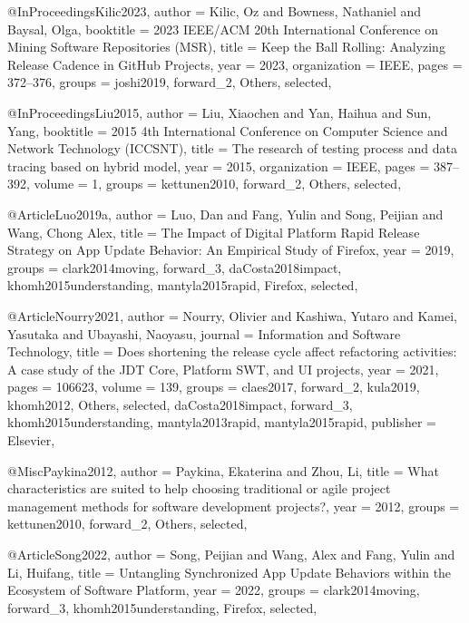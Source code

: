 @InProceedings{Kilic2023,
  author       = {Kilic, Oz and Bowness, Nathaniel and Baysal, Olga},
  booktitle    = {2023 IEEE/ACM 20th International Conference on Mining Software Repositories (MSR)},
  title        = {Keep the Ball Rolling: Analyzing Release Cadence in GitHub Projects},
  year         = {2023},
  organization = {IEEE},
  pages        = {372--376},
  groups       = {joshi2019, forward_2, Others, selected},
}

@InProceedings{Liu2015,
  author       = {Liu, Xiaochen and Yan, Haihua and Sun, Yang},
  booktitle    = {2015 4th International Conference on Computer Science and Network Technology (ICCSNT)},
  title        = {The research of testing process and data tracing based on hybrid model},
  year         = {2015},
  organization = {IEEE},
  pages        = {387--392},
  volume       = {1},
  groups       = {kettunen2010, forward_2, Others, selected},
}

@Article{Luo2019a,
  author = {Luo, Dan and Fang, Yulin and Song, Peijian and Wang, Chong Alex},
  title  = {The Impact of Digital Platform Rapid Release Strategy on App Update Behavior: An Empirical Study of Firefox},
  year   = {2019},
  groups = {clark2014moving, forward_3, daCosta2018impact, khomh2015understanding, mantyla2015rapid, Firefox, selected},
}

@Article{Nourry2021,
  author    = {Nourry, Olivier and Kashiwa, Yutaro and Kamei, Yasutaka and Ubayashi, Naoyasu},
  journal   = {Information and Software Technology},
  title     = {Does shortening the release cycle affect refactoring activities: A case study of the JDT Core, Platform SWT, and UI projects},
  year      = {2021},
  pages     = {106623},
  volume    = {139},
  groups    = {claes2017, forward_2, kula2019, khomh2012, Others, selected, daCosta2018impact, forward_3, khomh2015understanding, mantyla2013rapid, mantyla2015rapid},
  publisher = {Elsevier},
}

@Misc{Paykina2012,
  author = {Paykina, Ekaterina and Zhou, Li},
  title  = {What characteristics are suited to help choosing traditional or agile project management methods for software development projects?},
  year   = {2012},
  groups = {kettunen2010, forward_2, Others, selected},
}

@Article{Song2022,
  author = {Song, Peijian and Wang, Alex and Fang, Yulin and Li, Huifang},
  title  = {Untangling Synchronized App Update Behaviors within the Ecosystem of Software Platform},
  year   = {2022},
  groups = {clark2014moving, forward_3, khomh2015understanding, Firefox, selected},
}

